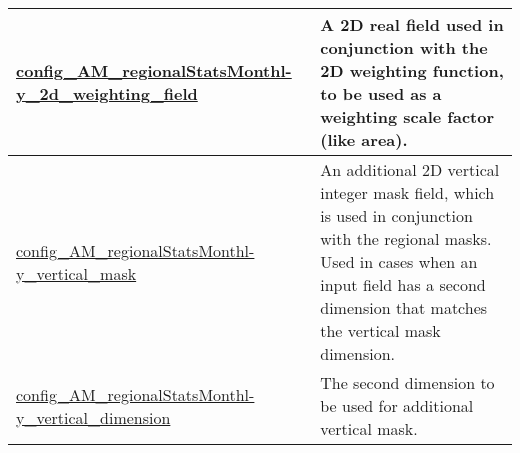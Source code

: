 {\begin{center}
\begin{longtable}{| p{2.0in} || p{4.0in} |}
    \hline
    \hyperref[subsec:nm_sec_config_AM_regionalStatsMonthly_2d_weighting_field]{config\_AM\_regionalStatsMonthl-}\hyperref[subsec:nm_sec_config_AM_regionalStatsMonthly_2d_weighting_field]{y\_2d\_weighting\_field}& A 2D real field used in conjunction with the 2D weighting function, to be used as a weighting scale factor (like area). \\
    \hline
    \hyperref[subsec:nm_sec_config_AM_regionalStatsMonthly_vertical_mask]{config\_AM\_regionalStatsMonthl-}\hyperref[subsec:nm_sec_config_AM_regionalStatsMonthly_vertical_mask]{y\_vertical\_mask}& An additional 2D vertical integer mask field, which is used in conjunction with the regional masks. Used in cases when an input field has a second dimension that matches the vertical mask dimension. \\
    \hline
    \hyperref[subsec:nm_sec_config_AM_regionalStatsMonthly_vertical_dimension]{config\_AM\_regionalStatsMonthl-}\hyperref[subsec:nm_sec_config_AM_regionalStatsMonthly_vertical_dimension]{y\_vertical\_dimension}& The second dimension to be used for additional vertical mask. \\
    \hline
\end{longtable}
\end{center}
}
